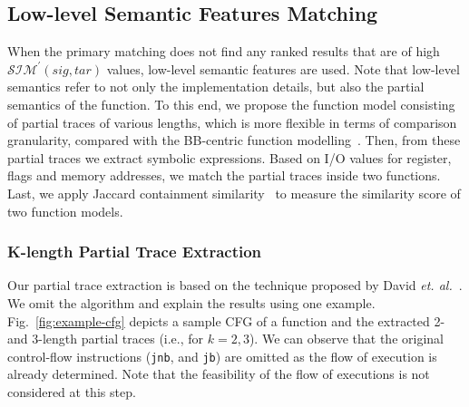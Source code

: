 \subsection{Low-level Semantic Features Matching} \label{subsec:matching:lowFea}
When the primary matching does not find any ranked results that are of high $\mathcal{SIM^\prime}(sig, tar)$ values, low-level semantic features are used.
Note that low-level semantics refer to not only the implementation details, but also the partial semantics of the function.
To this end, we propose the function model consisting of partial traces of various lengths, %
which is more flexible in terms of comparison granularity, compared with the BB-centric
function modelling~\cite{DBLP:conf/sp/PewnyGGRH15,luo2014semantics}. Then, from these partial traces we extract symbolic expressions. Based on I/O values for register, flags and memory addresses, we match the partial traces inside two functions. %
Last, we apply Jaccard containment similarity~\cite{agrawal2010indexing} to measure the similarity score of two function models.
\subsubsection{K-length Partial Trace Extraction} \label{subsec:partial_trace_ext}
Our partial trace extraction is based on the technique proposed by David \emph{et. al.}~\cite{DBLP:conf/pldi/DavidY14}.
We omit the algorithm and explain the results using one example.
Fig.~\ref{fig:example-cfg} depicts a sample CFG of a function and the extracted 2- and 3-length partial traces (i.e., for $k=2,3$). We can observe that the original control-flow instructions (\texttt{jnb}, and \texttt{jb}) are omitted as the flow of execution is already determined. Note that the feasibility of the flow of executions is not considered at this step. %

